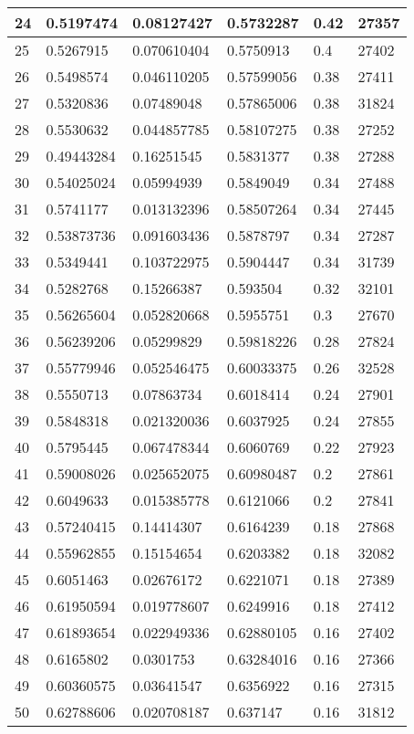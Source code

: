\begin{longtable}{|l|l|l|l|l|l|}
24 & 0.5197474 & 0.08127427 & 0.5732287 & 0.42 & 27357 \\ \hline 
25 & 0.5267915 & 0.070610404 & 0.5750913 & 0.4 & 27402 \\ \hline 
26 & 0.5498574 & 0.046110205 & 0.57599056 & 0.38 & 27411 \\ \hline 
27 & 0.5320836 & 0.07489048 & 0.57865006 & 0.38 & 31824 \\ \hline 
28 & 0.5530632 & 0.044857785 & 0.58107275 & 0.38 & 27252 \\ \hline 
29 & 0.49443284 & 0.16251545 & 0.5831377 & 0.38 & 27288 \\ \hline 
30 & 0.54025024 & 0.05994939 & 0.5849049 & 0.34 & 27488 \\ \hline 
31 & 0.5741177 & 0.013132396 & 0.58507264 & 0.34 & 27445 \\ \hline 
32 & 0.53873736 & 0.091603436 & 0.5878797 & 0.34 & 27287 \\ \hline 
33 & 0.5349441 & 0.103722975 & 0.5904447 & 0.34 & 31739 \\ \hline 
34 & 0.5282768 & 0.15266387 & 0.593504 & 0.32 & 32101 \\ \hline 
35 & 0.56265604 & 0.052820668 & 0.5955751 & 0.3 & 27670 \\ \hline 
36 & 0.56239206 & 0.05299829 & 0.59818226 & 0.28 & 27824 \\ \hline 
37 & 0.55779946 & 0.052546475 & 0.60033375 & 0.26 & 32528 \\ \hline 
38 & 0.5550713 & 0.07863734 & 0.6018414 & 0.24 & 27901 \\ \hline 
39 & 0.5848318 & 0.021320036 & 0.6037925 & 0.24 & 27855 \\ \hline 
40 & 0.5795445 & 0.067478344 & 0.6060769 & 0.22 & 27923 \\ \hline 
41 & 0.59008026 & 0.025652075 & 0.60980487 & 0.2 & 27861 \\ \hline 
42 & 0.6049633 & 0.015385778 & 0.6121066 & 0.2 & 27841 \\ \hline 
43 & 0.57240415 & 0.14414307 & 0.6164239 & 0.18 & 27868 \\ \hline 
44 & 0.55962855 & 0.15154654 & 0.6203382 & 0.18 & 32082 \\ \hline 
45 & 0.6051463 & 0.02676172 & 0.6221071 & 0.18 & 27389 \\ \hline 
46 & 0.61950594 & 0.019778607 & 0.6249916 & 0.18 & 27412 \\ \hline 
47 & 0.61893654 & 0.022949336 & 0.62880105 & 0.16 & 27402 \\ \hline 
48 & 0.6165802 & 0.0301753 & 0.63284016 & 0.16 & 27366 \\ \hline 
49 & 0.60360575 & 0.03641547 & 0.6356922 & 0.16 & 27315 \\ \hline 
50 & 0.62788606 & 0.020708187 & 0.637147 & 0.16 & 31812 \\ \hline 
\end{longtable}